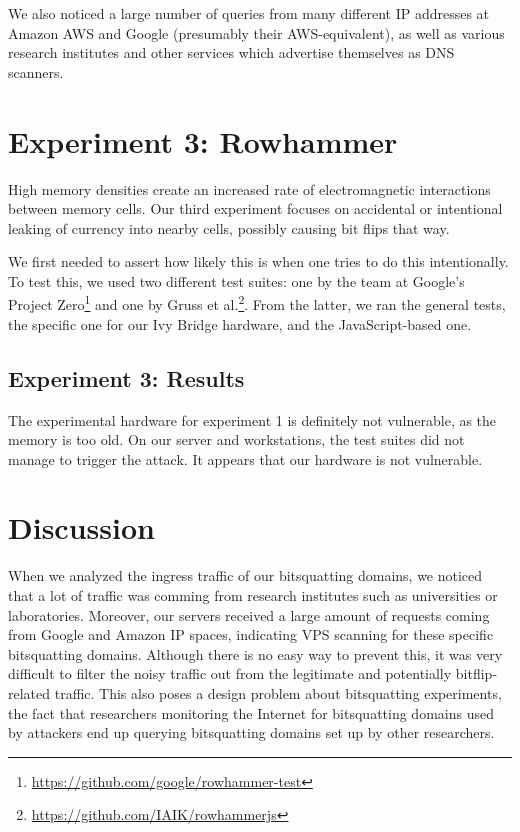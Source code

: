 \documentclass[conference]{IEEEtran}
\begin{document}
We also noticed a large number of queries from many different IP addresses at
Amazon AWS and Google (presumably their AWS-equivalent), as well as various
research institutes and other services which advertise themselves as DNS
scanners.



\section{Experiment 3: Rowhammer}

High memory densities create an increased rate of electromagnetic interactions
between memory cells\cite{kim2014flipping}. Our third experiment focuses on
accidental or intentional leaking of currency into nearby cells, possibly
causing bit flips that way.

We first needed to assert how likely this is when one tries to do this
intentionally. To test this, we used two different test suites: one by the team
at Google's Project Zero\footnote{\url{https://github.com/google/rowhammer-test}}
and one by Gruss et al.\cite{gruss2016rowhammer}\footnote{\url{https://github.com/IAIK/rowhammerjs}}.
From the latter, we ran the general tests, the specific one for our Ivy Bridge
hardware, and the JavaScript-based one.


\subsection{Experiment 3: Results}

The experimental hardware for experiment 1 is definitely not vulnerable, as the
memory is too old. On our server and workstations, the test suites did not
manage to trigger the attack. It appears that our hardware is not vulnerable.



\section{Discussion}\label{sec:disc}

When we analyzed the ingress traffic of our bitsquatting domains, we noticed
that a lot of traffic was comming from research institutes such as universities
or laboratories. Moreover, our servers received a large amount of requests
coming from Google and Amazon IP spaces, indicating VPS scanning for these
specific bitsquatting domains.  Although there is no easy way to prevent this,
it was very difficult to filter the noisy traffic out from the legitimate and
potentially bitflip-related traffic. This also poses a design problem about
bitsquatting experiments, the fact that researchers monitoring the Internet for
bitsquatting domains used by attackers end up querying bitsquatting domains set
up by other researchers.
\end{document}
